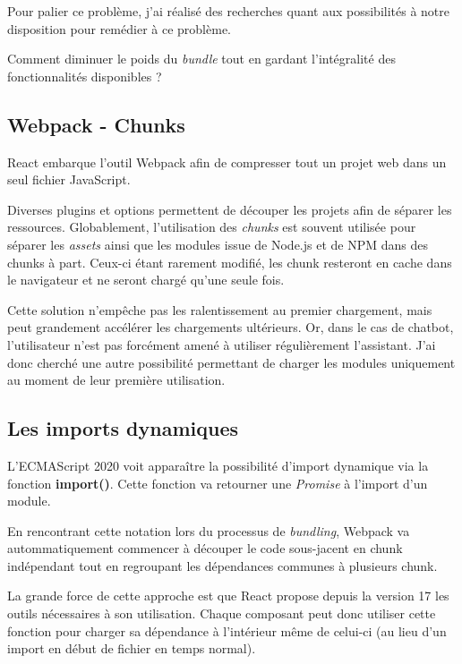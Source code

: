 \documentclass[12pt,a4paper,oneside]{scrreprt}
\begin{document}
Pour palier ce problème, j'ai réalisé des recherches quant aux possibilités à notre disposition pour remédier à ce problème.

\begin{problem}
	Comment diminuer le poids du \textit{bundle} tout en gardant l'intégralité des fonctionnalités disponibles ?
\end{problem}

\subsection{Webpack - Chunks}

React embarque l'outil Webpack afin de compresser tout un projet web dans un seul fichier JavaScript.

Diverses plugins et options permettent de découper les projets afin de séparer les ressources. Globablement, l'utilisation des \textit{chunks} est souvent utilisée pour séparer les \textit{assets} ainsi que les modules issue de Node.js et de NPM dans des chunks à part. Ceux-ci étant rarement modifié, les chunk resteront en cache dans le navigateur et ne seront chargé qu'une seule fois.

Cette solution n'empêche pas les ralentissement au premier chargement, mais peut grandement accélérer les chargements ultérieurs. Or, dans le cas de chatbot, l'utilisateur n'est pas forcément amené à utiliser régulièrement l'assistant. J'ai donc cherché une autre possibilité permettant de charger les modules uniquement au moment de leur première utilisation.

\subsection{Les imports dynamiques}

L'ECMAScript 2020 voit apparaître la possibilité d'import dynamique via la fonction \textbf{import()}. Cette fonction va retourner une \textit{Promise} à l'import d'un module.

En rencontrant cette notation lors du processus de \og\textit{bundling}\fg{}, Webpack va autommatiquement commencer à découper le code sous-jacent en chunk indépendant tout en regroupant les dépendances communes à plusieurs chunk.

La grande force de cette approche est que React propose depuis la version 17 les outils nécessaires à son utilisation. Chaque composant peut donc utiliser cette fonction pour charger sa dépendance à l'intérieur même de celui-ci (au lieu d'un import en début de fichier en temps normal).
\end{document}
